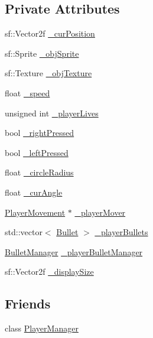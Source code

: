 \subsection*{Private Attributes}
\begin{DoxyCompactItemize}
\item 
sf\+::\+Vector2f \hyperlink{class_player_a3eee43afb7a372baca390749259949f8}{\+\_\+cur\+Position}
\item 
sf\+::\+Sprite \hyperlink{class_player_a6b0a2f6db37865415e5855868d469a15}{\+\_\+obj\+Sprite}
\item 
sf\+::\+Texture \hyperlink{class_player_a82b80133ff2c62d50718dca10b004be7}{\+\_\+obj\+Texture}
\item 
float \hyperlink{class_player_a2058005a9cb8d0ee1930178ab5965ac1}{\+\_\+speed}
\item 
unsigned int \hyperlink{class_player_a3ac2d7fa51966139efd25bc1b8552208}{\+\_\+player\+Lives}
\item 
bool \hyperlink{class_player_a8aff890e78e0f13a19d412e1a1aa0c19}{\+\_\+right\+Pressed}
\item 
bool \hyperlink{class_player_a968f709b83915a6805d2f194b753e5a4}{\+\_\+left\+Pressed}
\item 
float \hyperlink{class_player_abfba97cad280b5f31cb10d5e3df35be3}{\+\_\+circle\+Radius}
\item 
float \hyperlink{class_player_abc54196e9192b4e91542f8edbafecf4b}{\+\_\+cur\+Angle}
\item 
\hyperlink{class_player_movement}{Player\+Movement} $\ast$ \hyperlink{class_player_ae56c992348833fc0cf154e55b2b348f8}{\+\_\+player\+Mover}
\item 
std\+::vector$<$ \hyperlink{class_bullet}{Bullet} $>$ \hyperlink{class_player_ab261cdf1236f7e794f9b405409315419}{\+\_\+player\+Bullets}
\item 
\hyperlink{class_bullet_manager}{Bullet\+Manager} \hyperlink{class_player_a89d5ba57b7de854e218b0917bfa5029d}{\+\_\+player\+Bullet\+Manager}
\item 
sf\+::\+Vector2f \hyperlink{class_player_a2782ada46f92cfdd3d68bcacd5253333}{\+\_\+display\+Size}
\end{DoxyCompactItemize}
\subsection*{Friends}
\begin{DoxyCompactItemize}
\item 
class \hyperlink{class_player_af4dd6083207676104071a0b097ff2bff}{Player\+Manager}
\end{DoxyCompactItemize}


